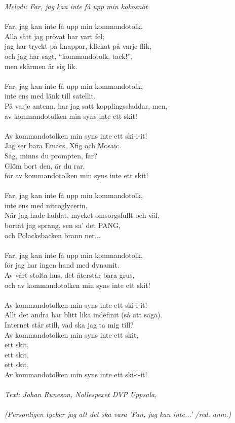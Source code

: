 {\footnotesize\textit{Melodi: Far, jag kan inte få upp min kokosnöt}}\\
\\
Far, jag kan inte få upp min kommandotolk.\\
Alla sätt jag prövat har vart fel;\\
jag har tryckt på knappar, klickat på varje flik,\\
och jag har sagt, “kommandotolk, tack!”,\\
men skärmen är sig lik.\\
\\
Far, jag kan inte få upp min kommandotolk,\\
inte ens med länk till satellit.\\
På varje antenn, har jag satt kopplingssladdar, men,\\
av kommandotolken min syns inte ett skit!\\
\\
Av kommandotolken min syns inte ett ski-i-it!\\
Jag ser bara Emacs, Xfig och Mosaic.\\
Säg, minns du prompten, far?\\
Glöm bort den, är du rar.\\
för av kommandotolken min syns inte ett skit!\\
\\
Far, jag kan inte få upp min kommandotolk,\\
inte ens med nitroglycerin.\\
När jag hade laddat, mycket omsorgsfullt och väl,\\
bortåt jag sprang, sen sa’ det PANG,\\
och Polacksbacken brann ner...\\
\\
Far, jag kan inte få upp min kommandotolk,\\
för jag har ingen hand med dynamit.\\
Av vårt stolta hus, det återstår bara grus,\\
och av kommandotolken min syns inte ett skit!\\
\\
Av kommandotolken min syns inte ett ski-i-it!\\
Allt det andra har blitt lika indefinit (så att säga).\\
Internet står still, vad ska jag ta mig till?\\
Av kommandotolken min syns inte ett skit,\\
ett skit,\\
ett skit,\\
ett skit,\\
Av kommandotolken min syns inte ett ski-i-it!\\
\\
{\footnotesize\textit{Text: Johan Runeson, Nollespexet DVP Uppsala,
    \\ \\ (Personligen tycker jag att det ska vara
    ’Fan, jag kan inte...’ /red. anm.)}}
